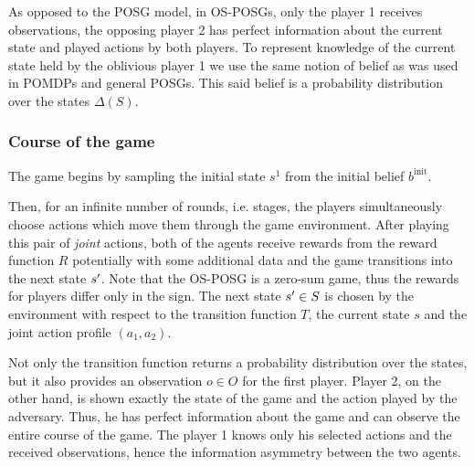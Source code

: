 \documentclass[../main.tex]{subfiles}
\begin{document}
As opposed to the POSG model, in OS-POSGs, only the player 1 receives observations, the opposing player 2 has perfect information about the current state and played actions by both players.
To represent knowledge of the current state held by the oblivious player 1 we use the same notion of belief as was used in POMDPs and general POSGs.
This said belief is a probability distribution over the states $\Delta(S)$.

\subsubsection{Course of the game}\label{bg:osposg:model:course}
The game begins by sampling the initial state $s^1$ from the initial belief $b^{\text{init}}$.

Then, for an infinite number of rounds, i.e. stages, the players simultaneously choose actions which move them through the game environment.
After playing this pair of \textit{joint} actions, both of the agents receive rewards from the reward function $R$ potentially with some additional data and the game transitions into the next state $s^{\prime}$.
Note that the OS-POSG is a zero-sum game, thus the rewards for players differ only in the sign.
The next state $s^{\prime} \in S$ is chosen by the environment with respect to the transition function $T$, the current state $s$ and the joint action profile $\left(a_1, a_2\right)$.

Not only the transition function returns a probability distribution over the states, but it also provides an observation $o \in O$ for the first player.
Player 2, on the other hand, is shown exactly the state of the game and the action played by the adversary.
Thus, he has perfect information about the game and can observe the entire course of the game.
The player 1 knows only his selected actions and the received observations, hence the information asymmetry between the two agents.
\end{document}

